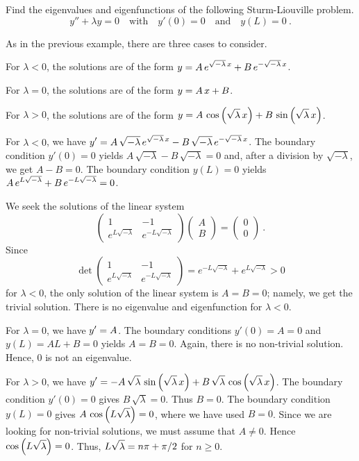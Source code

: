 \begin{egg}
Find the eigenvalues and eigenfunctions of the following
Sturm-Liouville problem.
\[
y''+ \lambda y = 0 \quad \text{with} \quad y'(0)=0 \quad \text{and}
\quad y(L) = 0 \ .
\]

As in the previous example, there are three cases to consider.

 For $\lambda < 0$, the solutions are of the form
$\displaystyle y = A\, e^{\sqrt{-\lambda}\,x}+
B\, e^{-\sqrt{-\lambda}\,x}$.

 For $\lambda = 0$, the solutions are of the form
$\displaystyle y = A\,x + B$.

 For $\lambda > 0$, the solutions are of the form
$\displaystyle y = A\, \cos\left(\sqrt{\lambda}\,x\right)+
B\, \sin\left(\sqrt{\lambda}\,x\right)$.

 For $\lambda < 0$, we have
$\displaystyle y' = A\,\sqrt{-\lambda}\, e^{\sqrt{-\lambda}\,x} -
B\, \sqrt{-\lambda}\, e^{-\sqrt{-\lambda}\,x}$.
The boundary condition $y'(0)=0$ yields
$A\,\sqrt{-\lambda} - B\, \sqrt{-\lambda} = 0$ and, after a division
by $\sqrt{-\lambda}$, we get $A-B=0$.  The boundary condition
$y(L) = 0$ yields
$\displaystyle A\, e^{L\sqrt{-\lambda}} + B\, e^{-L\sqrt{-\lambda}} =0$.

We seek the solutions of the linear system
\[
\begin{pmatrix}
1 & -1 \\
e^{L\sqrt{-\lambda}} & e^{-L\sqrt{-\lambda}}
\end{pmatrix}
\begin{pmatrix} A\\ B \end{pmatrix}
= \begin{pmatrix} 0 \\ 0 \end{pmatrix} \  .
\]
Since
\[
\det 
\begin{pmatrix}
1 & -1 \\
e^{L\sqrt{-\lambda}} & e^{-L\sqrt{-\lambda}}
\end{pmatrix}
= e^{-L\sqrt{-\lambda}} + e^{L\sqrt{-\lambda}} 
> 0
\]
for $\lambda < 0$, the only solution of the linear system is $A=B=0$;
namely, we get the trivial solution.  There is no eigenvalue and
eigenfunction for $\lambda <0$.

 For $\lambda = 0$, we have $\displaystyle y' = A$.
The boundary conditions $y'(0)= A= 0$ and $y(L) = AL +B = 0$ yields
$A=B=0$.  Again, there is no non-trivial solution.  Hence, $0$ is
not an eigenvalue.

 For $\lambda > 0$, we have
$\displaystyle y' = -A\,\sqrt{\lambda}\, \sin\left(\sqrt{\lambda}\,x\right) +
B\, \sqrt{\lambda}\, \cos\left(\sqrt{\lambda}\,x\right)$.
The boundary condition $y'(0)=0$ gives
$B\, \sqrt{\lambda} = 0$.  Thus $B=0$.  The boundary condition
$y(L) = 0$ gives
$\displaystyle A\,\cos\left(L\sqrt{\lambda}\right)=0$,
where we have used $B=0$. Since we are looking for non-trivial
solutions, we must assume that $A\neq 0$.  Hence
$\displaystyle \cos\left( L\sqrt{\lambda}\right) = 0$.  Thus,
$\displaystyle L\sqrt{\lambda} = n\pi + \pi/2$ for $n \geq 0$.


\end{egg}
